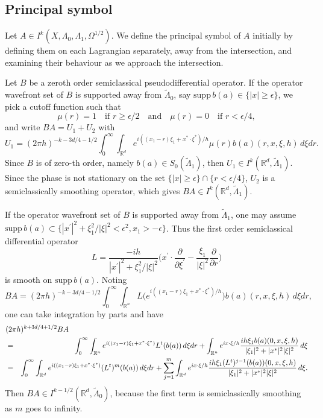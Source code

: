 \documentclass[10pt, a4paper, twoside]{amsart}
\numberwithin{equation}{section}
\theoremstyle{remark}
\begin{document}
\begin{appendix}
	
	
	
	
	
	
	
	
	
	
	\subsection{Principal symbol}
	Let $A \in I^k(X, \Lambda_0, \Lambda_1, \Omega^{1/2})$. We define the principal symbol of $A$ initially by defining them on each Lagrangian separately, away from the  intersection, and examining their behaviour as we approach the intersection. 
	
	Let $B$ be a zeroth order semiclassical pseudodifferential operator. 
	If the operator wavefront set of $B$ is supported away from $\tilde{\Lambda}_0$, say $\text{supp}\, b(a) \in \{|x| \geq \epsilon\}$, we pick a cutoff function such that $$\mu(r) = 1 \quad \mbox{if $r \geq \epsilon/2$} \quad \mbox{and} \quad \mu(r) = 0 \quad \mbox{if $r < \epsilon/4$},$$ and write $BA = U_1 + U_2$ with $$U_1 = (2\pi h)^{-k - 3d/4 - 1/2} \int_0^\infty \int_{\mathbb{R}^d} e^{i((x_1 - r)\xi_1 + x^\ast \cdot \xi^\ast)/h} \mu(r)  b(a)(r, x, \xi, h)\, d\xi dr.$$ Since $B$ is of zero-th order, namely $b(a) \in S_0(\tilde{\Lambda}_1)$, then $U_1 \in I^{k}(\mathbb{R}^d, \tilde{\Lambda}_1)$. Since the phase is not stationary on the set $\{|x| \geq \epsilon\}\cap \{r < \epsilon / 4\}$, $U_2$ is a semiclassically smoothing operator, which gives $BA \in I^{k}(\mathbb{R}^d, \tilde{\Lambda}_1)$.
	
	If the operator wavefront set of $B$ is supported away from $\tilde{\Lambda}_1$, one may assume $\text{supp} \, b(a) \subset \{|x^\prime|^2 + \xi_1^2 / |\xi|^2 < \epsilon^2, x_1 > - \epsilon\}$. Thus the first order semiclassical differential operator $$L = \frac{-ih}{|x^\prime|^2 + \xi_1^2 / |\xi|^2} \bigg(x^\prime \cdot \frac{\partial}{\partial \xi^\prime} - \frac{\xi_1}{|\xi|^2}\frac{\partial}{\partial r}\bigg)$$ is smooth on $\text{supp} \, b(a)$. Noting $$BA = (2\pi h)^{-k - 3d/4 - 1/2} \int_0^\infty \int_{\mathbb{R}^n} L\big(e^{i((x_1 - r)\xi_1 + x^\ast \cdot \xi^\ast)/h }\big) b(a)(r, x, \xi, h) \, d\xi dr,$$ one can take integration by parts and have \begin{eqnarray*}\lefteqn{(2\pi h)^{k + 3d/4 + 1/2} BA} \\&=& \int_0^\infty \int_{\mathbb{R}^n} e^{i((x_1 - r)\xi_1 + x^\ast \cdot \xi^\ast)} L^t(b(a)) \,d\xi dr + \int_{\mathbb{R}^n} e^{i x \cdot \xi / h} \frac{ih\xi_1 b(a)(0, x, \xi, h)}{|\xi_1|^2 + |x^\ast|^2|\xi|^2} \,d\xi\\&=&  \int_0^\infty \int_{\mathbb{R}^d} e^{i((x_1 - r)\xi_1 + x^\ast \cdot \xi^\ast)} (L^t)^m(b(a)) \,d\xi dr + \sum_{j = 1}^m\int_{\mathbb{R}^d} e^{i x \cdot \xi / h} \frac{ih\xi_1 (L^t)^{j - 1}(b(a))(0, x, \xi, h)}{|\xi_1|^2 + |x^\ast|^2|\xi|^2} \,d\xi.\end{eqnarray*} Then $BA \in I^{k - 1/2}(\mathbb{R}^d, \tilde{\Lambda}_0)$, because the first term is semiclassically smoothing as $m$ goes to infinity.
	

\end{appendix}
\end{document}
